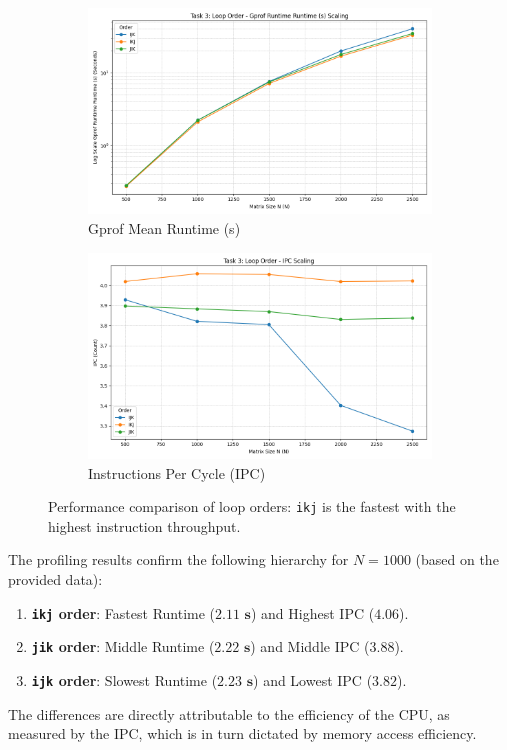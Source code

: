 \documentclass[11pt, a4paper]{article}
\begin{document}
\begin{figure}[h] %
    \centering
    \begin{subfigure}[b]{0.48\textwidth}
        \centering
        \includegraphics[width=\textwidth]{plots/task_3_loop_order_-__gprof_runtime_mean_s.png}
        \caption{Gprof Mean Runtime (s)}
        \label{fig:t3_runtime_order}
    \end{subfigure}
    \hfill
    \begin{subfigure}[b]{0.48\textwidth}
        \centering
        \includegraphics[width=\textwidth]{plots/task_3_loop_order_-__ipc.png}
        \caption{Instructions Per Cycle (IPC)}
        \label{fig:t3_ipc_order}
    \end{subfigure}
    \caption{Performance comparison of loop orders: \texttt{ikj} is the fastest with the highest instruction throughput.}
\end{figure}

The profiling results confirm the following hierarchy for $N=1000$ (based on the provided data):
\begin{enumerate}
    \item \textbf{\texttt{ikj} order}: Fastest Runtime ($\mathbf{2.11 \text{ s}}$) and Highest IPC ($\mathbf{4.06}$).
    \item \textbf{\texttt{jik} order}: Middle Runtime ($\mathbf{2.22 \text{ s}}$) and Middle IPC ($\mathbf{3.88}$).
    \item \textbf{\texttt{ijk} order}: Slowest Runtime ($\mathbf{2.23 \text{ s}}$) and Lowest IPC ($\mathbf{3.82}$).
\end{enumerate}
The differences are directly attributable to the efficiency of the CPU, as measured by the IPC, which is in turn dictated by memory access efficiency.
\end{document}
